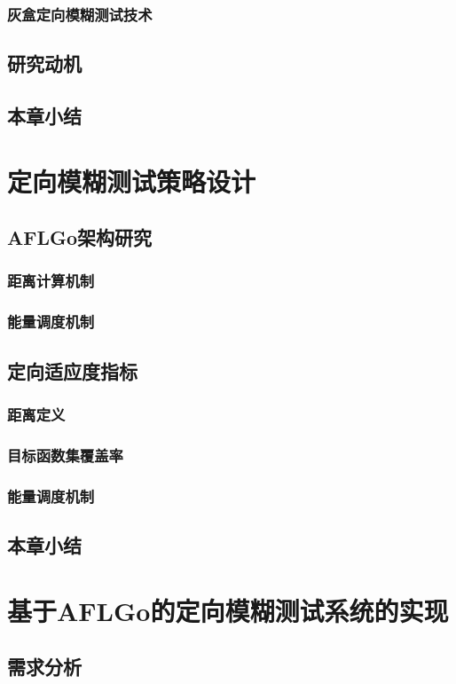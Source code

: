\documentclass[bachelor]{njupthesis}
\begin{document}
\subsection{灰盒定向模糊测试技术}
\section{研究动机}
\section{本章小结}

\chapter{定向模糊测试策略设计}
\section{AFLGo架构研究}
\subsection{距离计算机制}
\subsection{能量调度机制}
\section{定向适应度指标}
\subsection{距离定义}
\subsection{目标函数集覆盖率}
\subsection{能量调度机制}
\section{本章小结}


\chapter{基于AFLGo的定向模糊测试系统的实现}
\section{需求分析}
\end{document}

